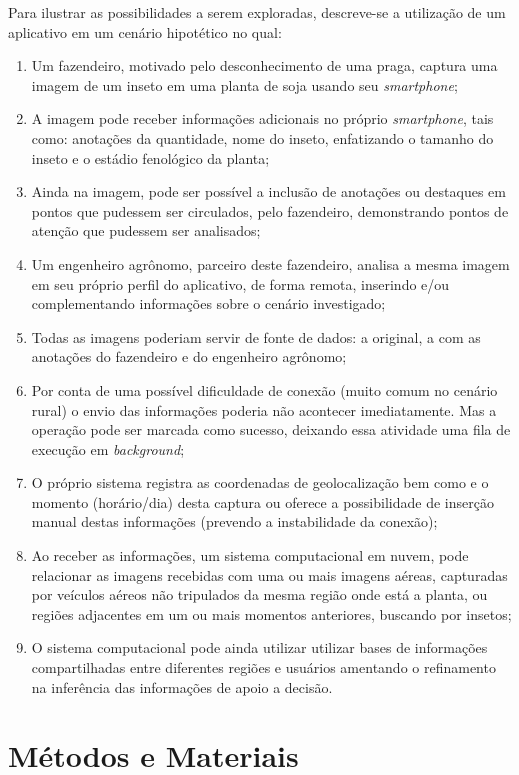 \documentclass[12pt]{article}
\begin{document}
Para ilustrar as possibilidades a serem exploradas, descreve-se a utilização de um aplicativo em um cenário hipotético no qual:

\begin{enumerate}
	\item Um fazendeiro, motivado pelo desconhecimento de uma praga, captura uma imagem de um inseto em uma planta de soja usando seu \textit{smartphone};
	\item A imagem pode receber informações adicionais no próprio \textit{smartphone}, tais como: anotações da quantidade, nome do inseto, enfatizando o tamanho do inseto e o estádio fenológico da planta;
	\item Ainda na imagem, pode ser possível a inclusão de anotações ou destaques em pontos que pudessem ser circulados, pelo fazendeiro, demonstrando pontos de atenção que pudessem ser analisados;
	\item Um engenheiro agrônomo, parceiro deste fazendeiro, analisa a mesma imagem em seu próprio perfil do aplicativo, de forma remota, inserindo e/ou complementando informações sobre o cenário investigado;
	\item Todas as imagens poderiam servir de fonte de dados: a original, a com as anotações do fazendeiro e do engenheiro agrônomo;
	\item Por conta de uma possível dificuldade de conexão (muito comum no cenário rural) o envio das informações poderia não acontecer imediatamente. Mas a operação pode ser marcada como sucesso, deixando essa atividade uma fila de execução em \textit{background};
	\item O próprio sistema registra as coordenadas de geolocalização bem como e o momento (horário/dia) desta captura ou oferece a possibilidade de inserção manual destas informações (prevendo a instabilidade da conexão);
	\item Ao receber as informações, um sistema computacional em nuvem, pode relacionar as imagens recebidas com uma ou mais imagens aéreas, capturadas por veículos aéreos não tripulados da mesma região onde está a planta, ou regiões adjacentes em um ou mais momentos anteriores, buscando por insetos;
	\item O sistema computacional pode ainda utilizar utilizar bases de informações compartilhadas entre diferentes regiões e usuários amentando o refinamento na inferência das informações de apoio a decisão.
\end{enumerate}

\section{Métodos e Materiais}
\label{sec:metodos_materiais}
		
\end{document}
